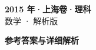 \documentclass[zihao=-4, a4paper]{ctexart}
\begin{document}
\begin{center}
  {\Large\bfseries 2015 年·上海卷·理科}\\[4pt]
  {\large 数学 · 解析版}
\end{center}
\medskip
{}

\clearpage
{}
\begin{center}{\Large\bfseries 参考答案与详细解析}\end{center}
\medskip

\end{document}

